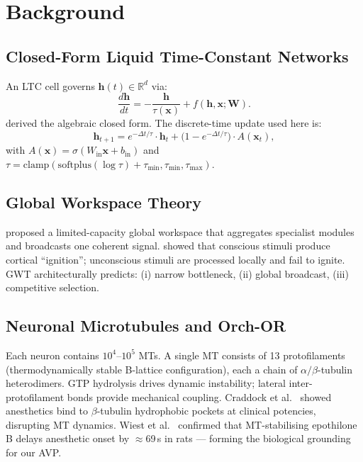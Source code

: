 \documentclass[11pt]{article}
\theoremstyle{definition}
\newcommand{\RR}{\mathbb{R}}
\newcommand{\vh}{\mathbf{h}}
\newcommand{\vx}{\mathbf{x}}
\newcommand{\vW}{\mathbf{W}}
\newcommand{\sigmoid}{\sigma}
\begin{document}
\section{Background}
\label{sec:background}

\subsection{Closed-Form Liquid Time-Constant Networks}
An LTC cell governs $\vh(t)\in\RR^d$ via:
\begin{equation}
  \frac{d\vh}{dt} = -\frac{\vh}{\tau(\vx)} + f(\vh,\vx;\vW).
\end{equation}
\citet{hasani2022closed} derived the algebraic closed form. The discrete-time update used here is:
\begin{equation}
  \vh_{t+1} = e^{-\Delta t/\tau}\cdot\vh_t + \bigl(1 - e^{-\Delta t/\tau}\bigr)\cdot A(\vx_t),
  \label{eq:cflnn}
\end{equation}
with $A(\vx)=\sigmoid(W_\text{in}\vx+b_\text{in})$ and $\tau = \mathrm{clamp}(\mathrm{softplus}(\log\tau)+\tau_\text{min}, \tau_\text{min}, \tau_\text{max})$.

\subsection{Global Workspace Theory}
\citet{baars1988cognitive} proposed a limited-capacity global workspace that aggregates specialist modules and broadcasts one coherent signal. \citet{dehaene2011experimental} showed that conscious stimuli produce cortical ``ignition''; unconscious stimuli are processed locally and fail to ignite. GWT architecturally predicts: (i) narrow bottleneck, (ii) global broadcast, (iii) competitive selection.

\subsection{Neuronal Microtubules and Orch-OR}
Each neuron contains $10^4$--$10^5$ MTs. A single MT consists of 13 protofilaments (thermodynamically stable B-lattice configuration), each a chain of $\alpha/\beta$-tubulin heterodimers. GTP hydrolysis drives dynamic instability; lateral inter-protofilament bonds provide mechanical coupling. Craddock et al.\ \citep{craddock2017anesthetic} showed anesthetics bind to $\beta$-tubulin hydrophobic pockets at clinical potencies, disrupting MT dynamics. Wiest et al.\ \citep{wiest2025quantum} confirmed that MT-stabilising epothilone B delays anesthetic onset by $\approx$69\,s in rats — forming the biological grounding for our AVP.
\end{document}
